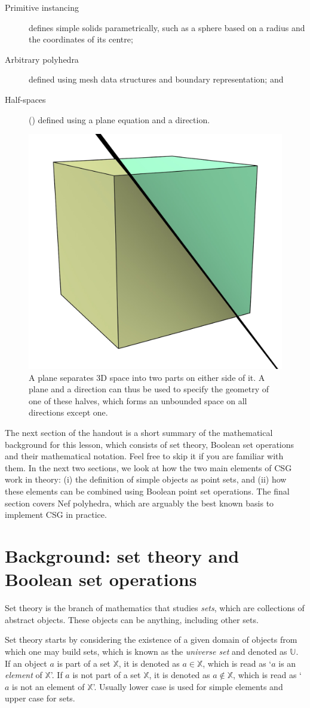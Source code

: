 \begin{description}
\item[Primitive instancing] defines simple solids parametrically, such as a sphere based on a radius and the coordinates of its centre;
\item[Arbitrary polyhedra] defined using mesh data structures and boundary representation; and
\item[Half-spaces] () defined using a plane equation and a direction.
\end{description}

\begin{figure}
\centering
\includegraphics[width=0.3\linewidth]{figs/halfspaces}
\caption{A plane separates 3D space into two parts on either side of it. A plane and a direction can thus be used to specify the geometry of one of these halves, which forms an unbounded space on all directions except one.}%
\label{fig:halfspaces}
\end{figure}

The next section of the handout is a short summary of the mathematical background for this lesson, which consists of set theory, Boolean set operations and their mathematical notation.
Feel free to skip it if you are familiar with them.
In the next two sections, we look at how the two main elements of CSG work in theory: (i) the definition of simple objects as point sets, and (ii) how these elements can be combined using Boolean point set operations.
The final section covers Nef polyhedra, which are arguably the best known basis to implement CSG in practice.

\section{Background: set theory and Boolean set operations}

Set theory is the branch of mathematics that studies \emph{sets}, which are collections of abstract objects.
These objects can be anything, including other sets.

Set theory starts by considering the existence of a given domain of objects from which one may build sets, which is known as the \emph{universe set} and denoted as \(\mathbb{U}\).
If an object \(a\) is part of a set \(\mathbb{X}\), it is denoted as \(a \in \mathbb{X}\), which is read as `\(a\) is an \emph{element} of \(\mathbb{X}\)'.
If \(a\) is not part of a set \(\mathbb{X}\), it is denoted as \(a \notin \mathbb{X}\), which is read as `\(a\) is not an element of \(\mathbb{X}\)'.
Usually lower case is used for simple elements and upper case for sets.

